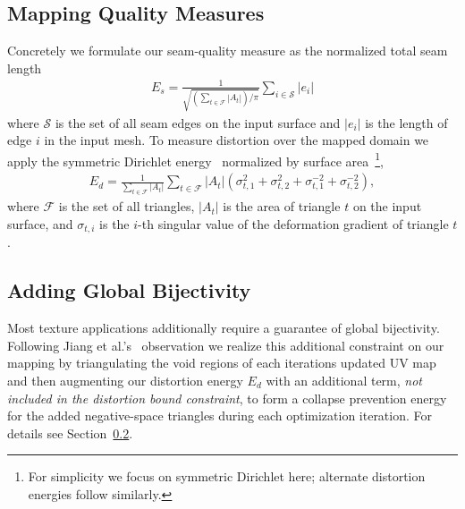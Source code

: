 \subsection{Mapping Quality Measures}
Concretely we formulate our seam-quality measure as the normalized total seam length
\begin{align}
E_s 
= \frac{1}{\sqrt{(\sum_{t\in\mathcal{F}} |A_t|)/\pi}} \sum_{i \in \mathcal{S}} |e_i|
\end{align}
where $\mathcal{S}$ is the set of all seam edges on the input surface and $|e_i|$ is the length of edge $i$ in the input mesh.
To measure distortion over the mapped domain we apply the symmetric Dirichlet energy~\cite{Smith2015Bijective} normalized by surface area~\footnote{For simplicity we focus on symmetric Dirichlet here; alternate distortion energies follow similarly.}, 
\begin{align} 
E_d 
= \frac{1}{\sum_{t\in\mathcal{F}} |A_t|} \sum_{t\in\mathcal{F}} |A_t|(\sigma_{t,1}^2 + \sigma_{t,2}^2 + \sigma_{t,1}^{-2} + \sigma_{t,2}^{-2}),
\end{align}
where $\mathcal{F}$ is the set of all triangles, $|A_t|$ is the area of triangle $t$ on the input surface, and $\sigma_{t,i}$ is the $i$-th singular value of the deformation gradient of triangle $t$.
%


\subsection{Adding Global Bijectivity}
Most texture applications additionally require a guarantee of global bijectivity. Following Jiang et al.'s\  observation we realize this additional constraint on our mapping by triangulating the void regions of each iterations updated UV map and then augmenting our distortion energy $E_d$ with an additional term, \emph{not included in the distortion bound constraint}, to form a collapse prevention energy for the added negative-space triangles during each optimization iteration. For details see Section\ \ref{}. 

